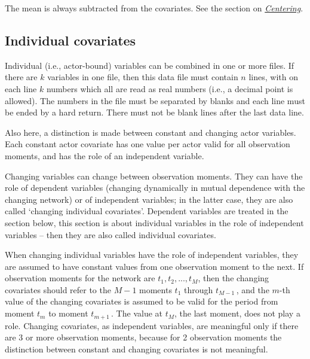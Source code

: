 \documentclass[a4paper,fleqn]{article}
\newcommand{\+}{\, + \,}
\begin{document}
{%

The mean is always subtracted from the covariates.
See the section on \hyperlink{T_S_centering}{\emph{Centering}}.

\subsection{Individual covariates}

Individual (i.e., actor-bound) variables can be combined in one or
more files. If there are $k$ variables in one file, then this data
file must contain $n$ lines, with on each line $k$ numbers which all
are read as real numbers (i.e., a decimal point is allowed). The
numbers in the file must be separated by blanks and each line must
be ended by a hard return. There must not be blank lines after the
last data line.

Also here, a distinction is made between constant and changing actor
variables. Each constant actor covariate has one value per actor
valid for all observation moments, and has the role of an
independent variable.

Changing variables can change between observation moments. They
can have the role of dependent variables (changing dynamically in
mutual dependence with the changing network) or of independent
variables; in the latter case, they are also called `changing
individual covariates'. Dependent variables are treated in the
section below, this section is about individual variables
in the role of independent variables -- then they are also
called individual covariates.

When changing individual variables have the role of
independent variables, they are assumed to have constant values from one
observation moment to the next. If observation moments for the
network are $t_1, t_2, ..., t_M$, then the changing covariates
should refer to the $M-1$ moments $t_1$ through $t_{M-1}\,$, and
the $m$-th value of the changing covariates is assumed to be valid
for the period from moment $t_m$ to moment $t_{m+1}\,$.
The value at $t_M$, the last moment, does not play a role.
Changing covariates, as independent variables, are meaningful
only if there are 3 or more observation moments,
because for 2 observation moments the distinction between
constant and changing covariates is not meaningful.

}
\end{document}
